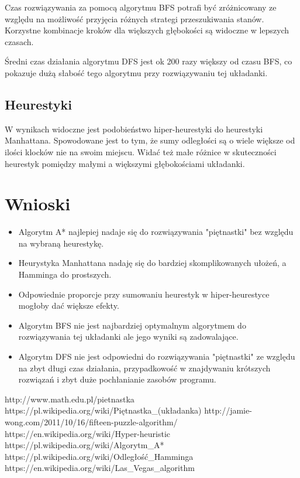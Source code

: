 \documentclass{classrep}
\begin{document}
Czas rozwiązywania za pomocą algorytmu BFS potrafi być zróżnicowany ze względu na możliwość przyjęcia różnych strategi przeszukiwania stanów. Korzystne kombinacje kroków dla większych głębokości są widoczne w lepszych czasach. 

Średni czas działania algorytmu DFS jest ok 200 razy większy od czasu BFS, co pokazuje dużą słabość tego algorytmu przy rozwiązywaniu tej układanki.
\subsection{Heurestyki}
W wynikach widoczne jest podobieństwo hiper-heurestyki do heurestyki Manhattana. Spowodowane jest to tym, że sumy odległości są o wiele większe od ilości klocków nie na swoim miejscu. 
Widać też małe różnice w skuteczności heurestyk pomiędzy małymi a większymi głębokościami układanki.

\section{Wnioski}
\begin{itemize}
	\item Algorytm A* najlepiej nadaje się do rozwiązywania "piętnastki" bez względu na wybraną heurestykę.
	\item Heurystyka Manhattana nadaję się do bardziej skomplikowanych ułożeń, a Hamminga do prostszych.
	\item Odpowiednie proporcje przy sumowaniu heurestyk w hiper-heurestyce mogłoby dać większe efekty.
	\item Algorytm BFS nie jest najbardziej optymalnym algorytmem do rozwiązywania tej układanki ale jego wyniki są zadowalające.
	\item Algorytm DFS nie jest odpowiedni do rozwiązywania "piętnastki" ze względu na zbyt długi czas działania, przypadkowość w znajdywaniu krótszych rozwiązań i zbyt duże pochłanianie zasobów programu.
\end{itemize}

\begin{thebibliography}{0}
 	 http://www.math.edu.pl/pietnastka
 	 https://pl.wikipedia.org/wiki/Piętnastka\_(układanka)
  	 http://jamie-wong.com/2011/10/16/fifteen-puzzle-algorithm/
	 https://en.wikipedia.org/wiki/Hyper-heuristic
  	 https://pl.wikipedia.org/wiki/Algorytm\_A*
	 https://pl.wikipedia.org/wiki/Odległość\_Hamminga
	 https://en.wikipedia.org/wiki/Las\_Vegas\_algorithm

\end{thebibliography}
\end{document}
